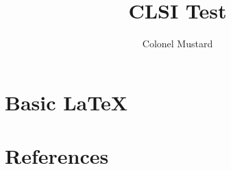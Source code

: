 \documentclass{report}
\title{CLSI Test}
\author{Colonel Mustard}
\begin{document}
  
  \chapter{Basic LaTeX}
  
  
  
  \chapter{References}
  
  

  
  
  
\end{document}
